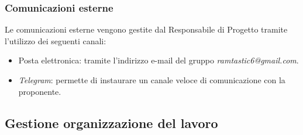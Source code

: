\subsubsection{Comunicazioni esterne}
Le comunicazioni esterne vengono gestite dal Responsabile di Progetto tramite l’utilizzo dei seguenti
canali:
\begin{itemize}
    \item  Posta elettronica: tramite l’indirizzo e-mail del gruppo \textit{ramtastic6@gmail.com}.
    \item  \textit{Telegram}: permette di instaurare un canale veloce di comunicazione con la proponente.
\end{itemize}

\subsection{Gestione organizzazione del lavoro}
